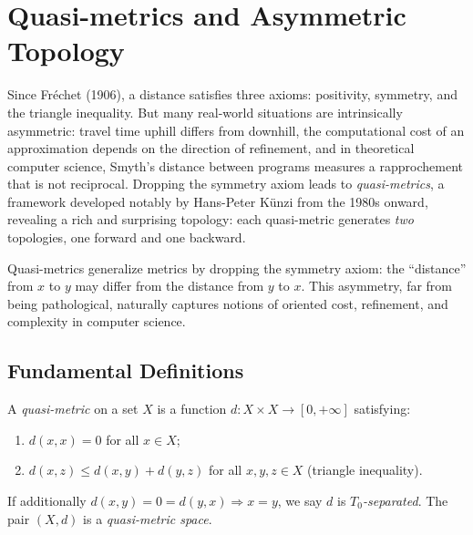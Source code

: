 \chapter{Quasi-metrics and Asymmetric Topology}
\label{ch:quasi_metrics}

Since Fr\'echet (1906), a distance satisfies three axioms: positivity, symmetry, and the triangle inequality. But many real-world situations are intrinsically asymmetric: travel time uphill differs from downhill, the computational cost of an approximation depends on the direction of refinement, and in theoretical computer science, Smyth's distance between programs measures a rapprochement that is not reciprocal. Dropping the symmetry axiom leads to \emph{quasi-metrics}, a framework developed notably by Hans-Peter K\"unzi from the 1980s onward, revealing a rich and surprising topology: each quasi-metric generates \emph{two} topologies, one forward and one backward.

\begin{intuition}
Quasi-metrics generalize metrics by dropping the symmetry axiom: the ``distance'' from $x$
to $y$ may differ from the distance from $y$ to $x$. This asymmetry, far from being
pathological, naturally captures notions of oriented cost, refinement, and complexity in
computer science.
\end{intuition}

\section{Fundamental Definitions}

\begin{definition}
A \emph{quasi-metric} on a set $X$ is a function $d\colon X \times X \to [0,+\infty]$
satisfying:
\begin{enumerate}
  \item $d(x,x) = 0$ for all $x \in X$;
  \item $d(x,z) \leq d(x,y) + d(y,z)$ for all $x,y,z \in X$ (triangle inequality).
\end{enumerate}
If additionally $d(x,y) = 0 = d(y,x) \Rightarrow x = y$, we say $d$ is
\emph{$T_0$-separated}. The pair $(X,d)$ is a \emph{quasi-metric space}.
\end{definition}

